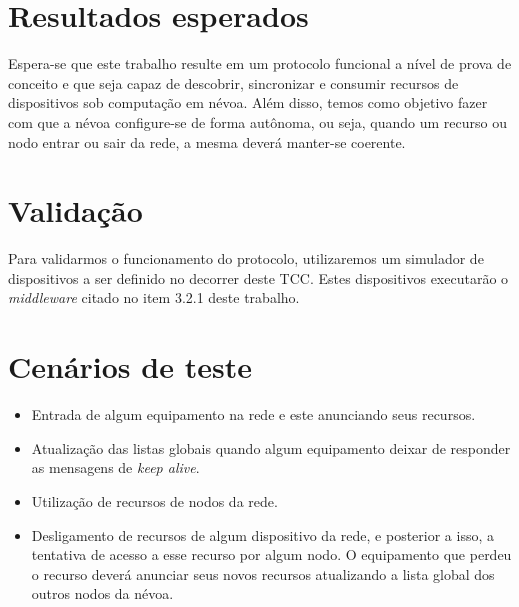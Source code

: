 

\section{Resultados esperados}

Espera-se que este trabalho resulte em um protocolo funcional a nível de prova de conceito e que seja capaz de descobrir, sincronizar e consumir recursos de dispositivos sob computação em névoa.
Além disso, temos como objetivo fazer com que a névoa configure-se de forma autônoma, ou seja, quando um recurso ou nodo entrar ou sair da rede, a mesma deverá manter-se coerente.


\section{Validação}

Para validarmos o funcionamento do protocolo, utilizaremos um simulador de dispositivos a ser definido no decorrer deste TCC.
Estes dispositivos executarão o \textit{middleware} citado no item 3.2.1 deste trabalho.

\section{Cenários de teste}

\begin{itemize}
    \item Entrada de algum equipamento na rede e este anunciando seus recursos. 
    \item Atualização das listas globais quando algum equipamento deixar de responder as mensagens de \textit{keep alive}.
    \item Utilização de recursos de nodos da rede.
    \item Desligamento de recursos de algum dispositivo da rede, e posterior a isso, a tentativa de acesso a esse recurso por algum nodo.
    O equipamento que perdeu o recurso deverá anunciar seus novos recursos atualizando a lista global dos outros nodos da névoa.
\end{itemize}










